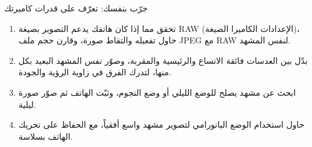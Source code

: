 \begin{tcbpractice}{جرّب بنفسك: تعرّف على قدرات كاميرتك}
\begin{enumerate}
  \item تحقق مما إذا كان هاتفك يدعم التصوير بصيغة RAW (الإعدادات الكاميرا الصيغة)، حاول تفعيله والتقاط صورة، وقارن حجم ملف JPEG مع RAW لنفس المشهد.
  \item بدّل بين العدسات فائقة الاتساع والرئيسية والمقربة، وصوّر نفس المشهد البعيد بكل منها، لتدرك الفرق في زاوية الرؤية والجودة.
  \item ابحث عن مشهد يصلح للوضع الليلي أو وضع النجوم، وثبّت الهاتف ثم صوّر صورة ليلية.
  \item حاول استخدام الوضع البانورامي لتصوير مشهد واسع أفقياً، مع الحفاظ على تحريك الهاتف بسلاسة.
\end{enumerate}

\end{tcbpractice}
